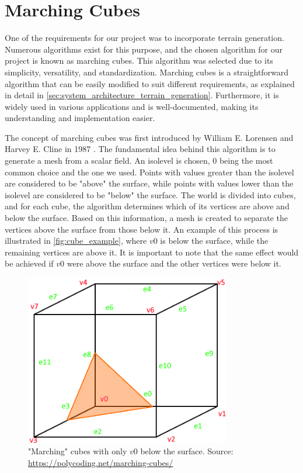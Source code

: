 \section{Marching Cubes} \label{sec:theory_theory_marching_cubes}
One of the requirements for our project was to incorporate terrain generation.
Numerous algorithms exist for this purpose, and the chosen algorithm for our project is known as marching cubes.
This algorithm was selected due to its simplicity, versatility, and standardization.
Marching cubes is a straightforward algorithm that can be easily modified to suit different requirements, as explained in detail in \autoref{sec:system_architecture_terrain_generation}.
Furthermore, it is widely used in various applications and is well-documented, making its understanding and implementation easier.

The concept of marching cubes was first introduced by William E. Lorensen and Harvey E. Cline in 1987 \cite{Marching-Cubes}.
The fundamental idea behind this algorithm is to generate a mesh from a scalar field.
An isolevel is chosen, 0 being the most common choice and the one we used.
Points with values greater than the isolevel are considered to be "above" the surface, while points with values lower than the isolevel are considered to be "below" the surface.
The world is divided into cubes, and for each cube, the algorithm determines which of its vertices are above and below the surface.
Based on this information, a mesh is created to separate the vertices above the surface from those below it.
An example of this process is illustrated in \autoref{fig:cube_example}, where $v0$ is below the surface, while the remaining vertices are above it.
It is important to note that the same effect would be achieved if $v0$ were above the surface and the other vertices were below it.

\begin{figure}[H]
    \centering
    \includegraphics[width=0.8\textwidth]{chapters/theoretical_foundations/sections/marching_cubes/resources/cube-example.png}
    \caption["Marching" cubes with only $v0$ below the surface.]{"Marching" cubes with only $v0$ below the surface. Source: \url{https://polycoding.net/marching-cubes/}}
    \label{fig:cube_example}
\end{figure}

